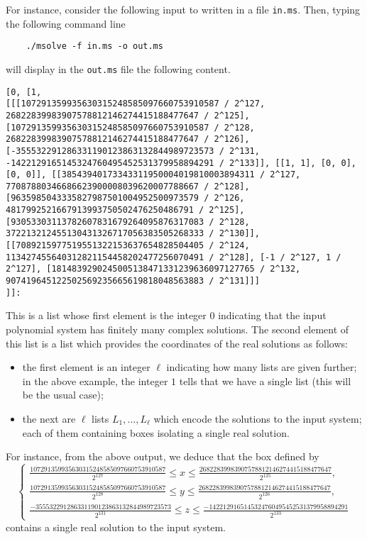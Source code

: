 \documentclass[a4paper,english,11pt]{scrartcl}
\theoremstyle{definition}
\theoremstyle{remark}
\def\leq{\leqslant}
\begin{document}
For instance, consider the following input to \msolve written in a file
\verb+in.ms+.
Then, typing the following command line
\begin{tcolorbox} %
  \begin{verbatim}
    ./msolve -f in.ms -o out.ms 
  \end{verbatim}
\end{tcolorbox}
will display in the \verb+out.ms+ file the following content. 
\begin{tcolorbox} %
  \begin{lstlisting}
[0, [1,
[[[107291359935630315248585097660753910587 / 2^127, 26822839983907578812146274415188477647 / 2^125], [107291359935630315248585097660753910587 / 2^128, 26822839983907578812146274415188477647 / 2^126], [-355532291286331190123863132844989723573 / 2^131, -1422129165145324760495452531379958894291 / 2^133]], [[1, 1], [0, 0], [0, 0]], [[38543940173343311950004019810003894311 / 2^127, 77087880346686623900008039620007788667 / 2^128], [9635985043335827987501004952500973579 / 2^126, 4817992521667913993750502476250486791 / 2^125], [93053303113782607831679264095876317083 / 2^128, 372213212455130431326717056383505268333 / 2^130]], [[7089215977519551322153637654828504405 / 2^124, 113427455640312821154458202477256070491 / 2^128], [-1 / 2^127, 1 / 2^127], [1814839290245005138471331239636097127765 / 2^132, 907419645122502569235665619818048563883 / 2^131]]]
]]:
  \end{lstlisting}
\end{tcolorbox}
This is a list whose first element is the integer $0$ indicating that the input
polynomial system has finitely many complex solutions. The second element of
this list is a list which provides the coordinates of the real solutions as
follows:
\begin{itemize}
\item the first element is an integer $\ell$ indicating how many lists are given
  further; in the above example, the integer $1$ tells that we have a single
  list (this will be the usual case);
\item the next are $\ell$ lists $L_1, \ldots, L_\ell$ which encode the solutions
  to the input system; each of them containing boxes isolating a single real
  solution. 
\end{itemize}
For instance, from the above output, we deduce that the box defined by 
\[
  \left \{
    \begin{array}{l}
      \frac{107291359935630315248585097660753910587}{2^{127}}
      \leq x \leq
      \frac{26822839983907578812146274415188477647}{2^{125}}, \\
      \frac{107291359935630315248585097660753910587}{2^{128}}
      \leq y \leq
      \frac{26822839983907578812146274415188477647}{2^{126}}, \\
      \frac{-355532291286331190123863132844989723573}{2^{131}}
      \leq z \leq
      \frac{-1422129165145324760495452531379958894291}{2^{133}}
\end{array}\right .
\]
contains a single real solution to the input system.
\end{document}

